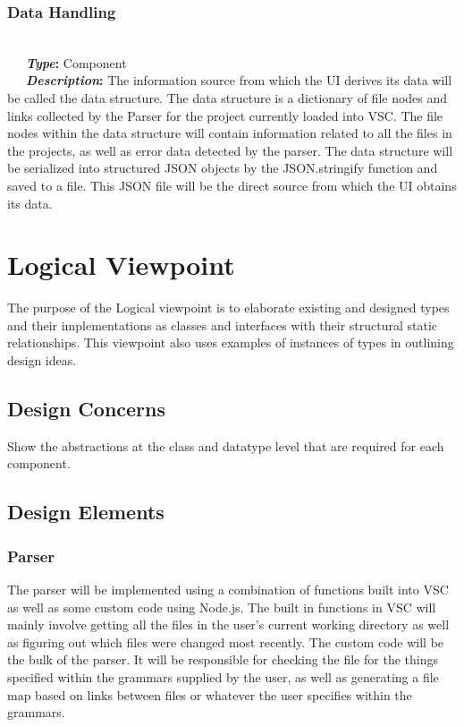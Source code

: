 \documentclass[letterpaper,10pt,titlepage,draftclsnofoot,onecolumn,onesided] {IEEEtran}
\newcommand{\bolditin}[2]{
	\-\ \-\ \-\ \textbf{\textit{#1}#2}
}
\begin{document}
\subsubsection{Data Handling} 
\hfill \\
\bolditin{Type}{:} Component \\
\bolditin{Description}{:}The information source from which the UI derives its data will be called the data structure. 
The data structure is a dictionary of file nodes and links collected by the Parser for the project currently loaded into VSC. 
The file nodes within the data structure will contain information related to all the files in the projects, as well as error data detected by the parser.
The data structure will be serialized into structured JSON objects by the JSON.stringify function and saved to a file. \cite{stringify}
This JSON file will be the direct source from which the UI obtains its data.

\section{Logical Viewpoint}
The purpose of the Logical viewpoint is to elaborate existing and designed types and their implementations
as classes and interfaces with their structural static relationships. This viewpoint also uses examples of
instances of types in outlining design ideas. 

\subsection{Design Concerns}
Show the abstractions at the class and datatype level that are required for each component. 

\subsection{Design Elements}

\subsubsection{Parser}	
The parser will be implemented using a combination of functions built into VSC as well as some custom code using Node.js.
The built in functions in VSC will mainly involve getting all the files in the user's current working directory as well as figuring out which files were changed most recently.
The custom code will be the bulk of the parser.
It will be responsible for checking the file for the things specified within the grammars supplied by the user, as well as generating a file map based on links between files or whatever the user specifies within the grammars.
	
\end{document}
